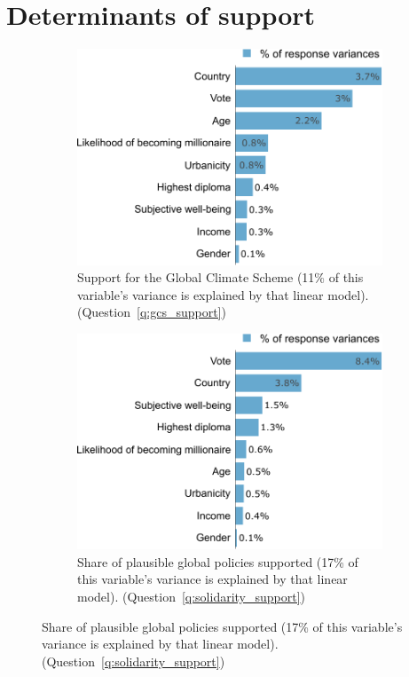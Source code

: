 \section{Determinants of support}\label{app:determinants}


\begin{figure}[h!]
\caption[Variance decomposition]{Variance decomposition: share of the variance explained by each covariate.}\label{fig:lmg}
\begin{subfigure}{.49\textwidth}
  \caption[]{Support for the Global Climate Scheme (11\% of this variable's variance is explained by that linear model). (Question~\ref{q:gcs_support})\label{fig:lmg_gcs}}
  \includegraphics[width=\textwidth]{../figures/all/lmg_gcs_support_few.pdf}
\end{subfigure} \quad
\begin{subfigure}{.49\textwidth}
  \caption[]{Share of plausible global policies supported (17\% of this variable's variance is explained by that linear model). (Question~\ref{q:solidarity_support})\label{fig:lmg_solidarity}}
  \includegraphics[width=\textwidth]{../figures/all/lmg_share_solidarity_supported_few.pdf}
\end{subfigure}
\end{figure}

